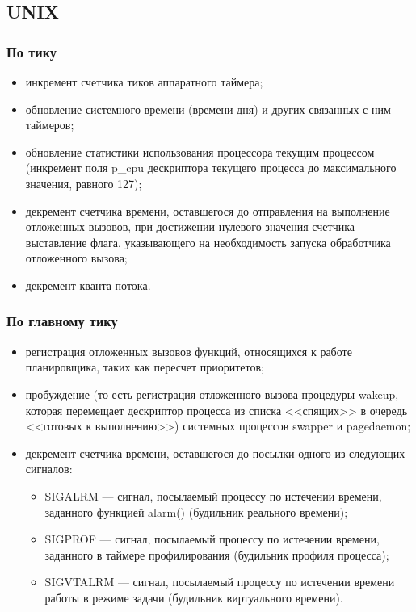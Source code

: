 \documentclass[a4paper,oneside,14pt]{extarticle}
\begin{document}
\subsection{UNIX}

\subsubsection*{По тику}
\begin{itemize}
	\item инкремент счетчика тиков аппаратного таймера;
	\item обновление системного времени (времени дня) и других связанных с ним таймеров;
	\item обновление статистики использования процессора текущим процессом (инкремент поля p\_cpu дескриптора текущего процесса до максимального значения, равного 127);
	\item декремент счетчика времени, оставшегося до отправления на выполнение отложенных вызовов, при достижении нулевого значения счетчика --- выставление флага, указывающего на необходимость запуска обработчика отложенного вызова;
    \item декремент кванта потока.
\end{itemize}

\subsubsection*{По главному тику} 
\begin{itemize}
	\item регистрация отложенных вызовов функций, относящихся к работе планировщика,
	таких как пересчет приоритетов;
	\item пробуждение (то есть регистрация отложенного вызова процедуры wakeup, которая перемещает дескриптор процесса из списка <<спящих>> в очередь <<готовых к выполнению>>) системных процессов swapper и pagedaemon;
	\item декремент счетчика времени, оставшегося до посылки одного из следующих сигналов:
	\begin{itemize}
		\item SIGALRM --- сигнал, посылаемый процессу по истечении времени, заданного функцией alarm() (будильник реального времени);
		\item SIGPROF --- сигнал, посылаемый процессу по истечении времени, заданного в таймере профилирования (будильник профиля процесса);
		\item SIGVTALRM --- сигнал, посылаемый процессу по истечении времени работы в режиме задачи (будильник виртуального времени).
	\end{itemize}
\end{itemize}
\end{document}

